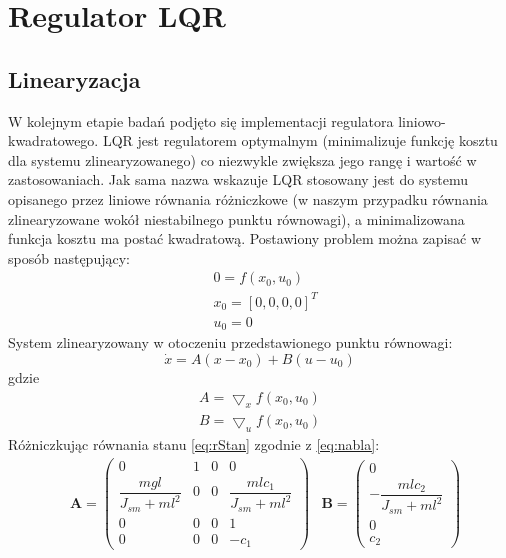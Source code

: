 \section{Regulator LQR}
\subsection{Linearyzacja}
W kolejnym etapie badań podjęto się implementacji regulatora liniowo-kwadratowego. LQR jest regulatorem optymalnym (minimalizuje funkcję kosztu dla systemu zlinearyzowanego) co niezwykle zwiększa jego rangę i wartość w zastosowaniach. Jak sama nazwa wskazuje LQR stosowany jest do systemu opisanego przez liniowe równania różniczkowe (w naszym przypadku równania zlinearyzowane wokół niestabilnego punktu równowagi), a minimalizowana funkcja kosztu ma postać kwadratową. Postawiony problem można zapisać w sposób następujący:
\begin{equation}
\begin{aligned}
&0 = f(x_{0},u_{0}) \\    
&x_{0} = [0, 0, 0, 0]^T \\
&u_{0} = 0
\end{aligned}
\end{equation}
System zlinearyzowany w otoczeniu przedstawionego punktu równowagi:
\begin{equation}
\dot{x} = A\left( x-x_{0}\right)  + B\left( u-u_{0}\right)     
\end{equation}
gdzie
\begin{equation}
\label{eq:nabla}
\begin{aligned}
A = \bigtriangledown_{x}f(x_{0},u_{0})  \\
B = \bigtriangledown_{u}f(x_{0},u_{0})
\end{aligned}
\end{equation}
Różniczkując równania stanu \ref{eq:rStan} zgodnie z \ref{eq:nabla}:
\begin{equation}
\label{eq:AB}
\begin{aligned}
&\mathbf{A} =
\left( \begin{array}{cccc}
0 & 1 & 0 & 0 \\
\dfrac{mgl}{J_{sm}+ml^2} & 0 & 0 & \dfrac{mlc_1}{J_{sm}+ml^2} \\
0 & 0 & 0 & 1 \\
0 & 0 & 0 & -c_1
\end{array} \right)
&\mathbf{B} =
\left( \begin{array}{cccc}
0 \\
-\dfrac{mlc_2}{J_{sm}+ml^2} \\
0 \\
c_2
\end{array} \right)
\end{aligned}
\end{equation}
